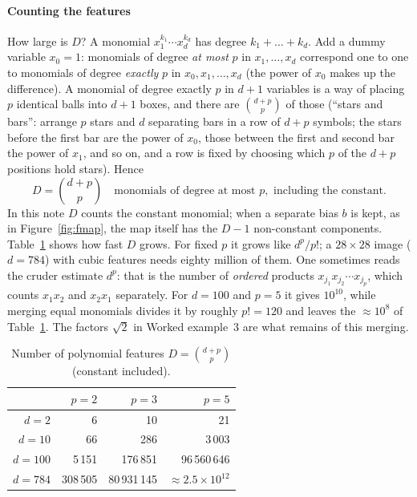 \documentclass[11pt]{article}
\begin{document}
\paragraph{Counting the features} How large is $D$? A monomial $x_1^{k_1}\cdots x_d^{k_d}$ has degree $k_1 + \dots +
k_d$. Add a dummy variable $x_0 = 1$: monomials of degree \emph{at most} $p$ in $x_1, \dots, x_d$ correspond one to one
to monomials of degree \emph{exactly} $p$ in $x_0, x_1, \dots, x_d$ (the power of $x_0$ makes up the difference). A
monomial of degree exactly $p$ in $d+1$ variables is a way of placing $p$ identical balls into $d+1$ boxes, and there
are $\binom{d+p}{p}$ of those (``stars and bars'': arrange $p$ stars and $d$ separating bars in a row of $d + p$
symbols; the stars before the first bar are the power of $x_0$, those between the first and second bar the power of
$x_1$, and so on, and a row is fixed by choosing which $p$ of the $d + p$ positions hold stars). Hence
\begin{equation}\label{eq:count}
  D = \binom{d+p}{p} \quad \text{monomials of degree at most } p, \text{ including the constant.}
\end{equation}
In this note $D$ counts the constant monomial; when a separate bias $b$ is kept, as in Figure~\ref{fig:fmap}, the map
itself has the $D - 1$ non-constant components. Table~\ref{tab:count} shows how fast $D$ grows. For fixed $p$ it grows
like $d^p/p!$; a $28 \times 28$ image ($d = 784$) with cubic features needs eighty million of them. One sometimes reads
the cruder estimate $d^p$: that is the number of \emph{ordered} products $x_{j_1}x_{j_2}\cdots x_{j_p}$, which counts
$x_1x_2$ and $x_2x_1$ separately. For $d = 100$ and $p = 5$ it gives $10^{10}$, while merging equal monomials divides
it by roughly $p! = 120$ and leaves the $\approx 10^8$ of Table~\ref{tab:count}. The factors $\sqrt2$ in Worked
example~3 are what remains of this merging.

\begin{table}[h]
\centering\small
\caption{Number of polynomial features $D = \binom{d+p}{p}$ (constant included).}
\label{tab:count}
\begin{tabular}{@{}rrrr@{}}
\toprule
& $p = 2$ & $p = 3$ & $p = 5$ \\
\midrule
$d = 2$ & 6 & 10 & 21 \\
$d = 10$ & 66 & 286 & 3\,003 \\
$d = 100$ & 5\,151 & 176\,851 & 96\,560\,646 \\
$d = 784$ & 308\,505 & 80\,931\,145 & $\approx 2.5 \times 10^{12}$ \\
\bottomrule
\end{tabular}
\end{table}
\end{document}
